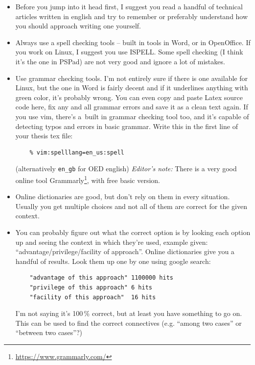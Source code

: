 \begin{itemize}
  \item{Before you jump into it head first, I suggest you read a handful of technical articles written in english and try to remember or preferably understand how you should approach writing one yourself.}
  \item{Always use a spell checking tools -- built in tools in Word, or in OpenOffice. If you work on Linux, I suggest you use ISPELL. Some spell checking (I think it's the one in PSPad) are not very good and ignore a lot of mistakes.}
  \item{Use grammar checking tools. I'm not entirely sure if there is one available for Linux, but the one in Word is fairly decent and if it underlines anything with green color, it's probably wrong. You can even copy and paste Latex source code here, fix any and all grammar errors and save it as a clean text again. If you use vim, there's a~built in grammar checking tool too, and it's capable of detecting typos and errors in basic grammar. Write this in the first line of your thesis tex file:
  \begin{verbatim}
    % vim:spelllang=en_us:spell
  \end{verbatim}
  (alternatively \texttt{en\_gb} for OED english) \textit{Editor's note:} There is a very good online tool Grammarly\footnote{\url{https://www.grammarly.com/}}, with free basic version.
  }
  \item{Online dictionaries are good, but don't rely on them in every situation. Usually you get multiple choices and not all of them are correct for the given context.}
  \item{\begin{samepage}You can probably figure out what the correct option is by looking each option up and seeing the context in which they're used, example given: ``advantage/privilege/facility of approach''. Online dictionaries give you a handful of results. Look them up one by one using google search:
  \begin{verbatim}
    "advantage of this approach" 1100000 hits
    "privilege of this approach" 6 hits
    "facility of this approach"  16 hits
  \end{verbatim}
  I'm not saying it's 100\,\% correct, but at least you have something to go on. This can be used to find the correct connectives (e.g. ``among two cases'' or ``between two cases''?)\end{samepage}}
\end{itemize}
       
